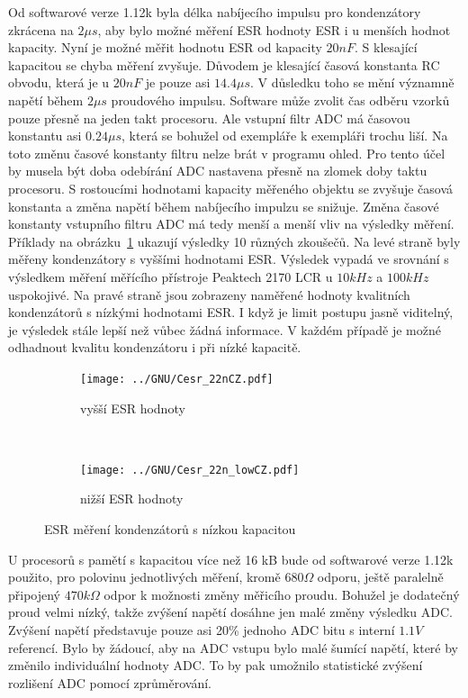 Od softwarové verze 1.12k byla délka nabíjecího impulsu pro kondenzátory zkrácena na \(2\mu s\), aby bylo možné měření ESR hodnoty ESR i u menších hodnot kapacity.
Nyní je možné měřit hodnotu ESR od kapacity \(20nF\).
S klesající kapacitou se chyba měření zvyšuje. Důvodem je klesající časová konstanta RC obvodu, která je u \(20nF\) je pouze asi \(14.4\mu s\).
V důsledku toho se mění významně napětí během \(2\mu s\) proudového impulsu.
Software může zvolit čas odběru vzorků pouze přesně na jeden takt procesoru. Ale vstupní filtr
ADC má časovou konstantu asi \(0.24\mu s\), která se bohužel od exempláře k exempláři trochu liší.
Na toto změnu časové konstanty filtru nelze brát v programu ohled.
Pro tento účel by musela být doba odebírání ADC nastavena přesně na zlomek doby taktu procesoru.
S rostoucími hodnotami kapacity měřeného objektu se zvyšuje časová konstanta a změna napětí během nabíjecího impulzu se snižuje.
Změna časové konstanty vstupního filtru ADC má tedy menší a menší vliv na výsledky měření.
Příklady na obrázku~\ref{pic:Cesr_22n} ukazují výsledky 10 různých zkoušečů.
Na levé straně byly měřeny kondenzátory s vyššími hodnotami ESR. Výsledek vypadá ve srovnání s výsledkem měření měřícího přístroje Peaktech 2170 LCR u \(10kHz\) a \(100kHz\) uspokojivé.
Na pravé straně jsou zobrazeny naměřené hodnoty kvalitních kondenzátorů s nízkými hodnotami ESR.
I když je limit postupu jasně viditelný, je výsledek stále lepší než vůbec žádná informace.
V každém případě je možné odhadnout kvalitu kondenzátoru i při nízké kapacitě.

\begin{figure}[H]
  \begin{subfigure}[b]{.5\textwidth}
    \centering
    \texttt{[image: ../GNU/Cesr\_22nCZ.pdf]}
    \caption{vyšší ESR hodnoty}
  \end{subfigure}
  ~
  \begin{subfigure}[b]{.5\textwidth}
    \centering
    \texttt{[image: ../GNU/Cesr\_22n\_lowCZ.pdf]}
    \caption{nižší ESR hodnoty}
  \end{subfigure}
  \caption{ESR měření kondenzátorů s nízkou kapacitou}
  \label{pic:Cesr_22n}
\end{figure}
 
U procesorů s pamětí s kapacitou více než 16 kB bude od softwarové verze 1.12k použito, pro polovinu jednotlivých měření, kromě \(680\Omega\) odporu, ještě paralelně připojený \(470k\Omega\) odpor
k možnosti změny měřicího proudu.
Bohužel je dodatečný proud velmi nízký, takže zvýšení napětí dosáhne jen malé změny výsledku ADC.
Zvýšení napětí představuje pouze asi 20\% jednoho ADC bitu s interní \(1.1V\) referencí.
Bylo by žádoucí, aby na ADC vstupu bylo malé šumící napětí, které by změnilo individuální hodnoty ADC.
To by pak umožnilo statistické zvýšení rozlišení ADC pomocí zprůměrování. 


